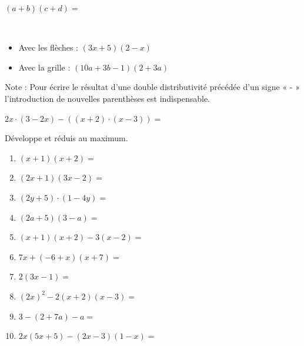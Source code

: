 \documentclass[../../syllabus_2.tex]{subfiles}
\begin{document}

$\left(a+b\right)\left(c+d\right)=$
\vspace*{2cm}

\exemples \\
\begin{itemize}[cols=2, label=, leftmargin=0pt]
  \item Avec les flèches : $\left(3x+5\right)\left(2-x\right)$
  \item Avec la grille : $\left(10a+3b-1\right)\left(2+3a\right)$
\end{itemize}

\vspace*{6cm}

Note : Pour écrire le résultat d’une double distributivité précédée d’un signe « - »  l’introduction de nouvelles parenthèses est indispensable. 

\exemple \(
  2x\cdot \left(3-2x\right) - \left(\left(x+2\right) \cdot \left(x-3\right)\right) = \)


\newpage
\begin{exercise}
  Développe et réduis au maximum.
  \begin{enumerate}[cols=2, itemsep=4cm]
    \item  $\left(x+1\right)\left(x+2\right)=$
    \item  $\left(2x+1\right)\left(3x-2\right)=$
    \item  $\left(2y+5\right)\cdot\left(1-4y\right)=$
    \item  $\left(2a+5\right)\left(3-a\right)=$
    \item  $\left(x+1\right)\left(x+2\right)-3\left(x-2\right)=$
    \item  $7x+\left(-6+x\right)\left(x+7\right)=$
    \item  $2\left(3x-1\right)=$
    \item  $\left(2x\right)^2-2\left(x+2\right)\left(x-3\right)=$
    \item  $3-\left(2+7a\right)-a=$
    \item  $2x\left(5x+5\right)-\left(2x-3\right)\left(1-x\right)=$
  \end{enumerate}
\end{exercise}

\newpage
\end{document}

